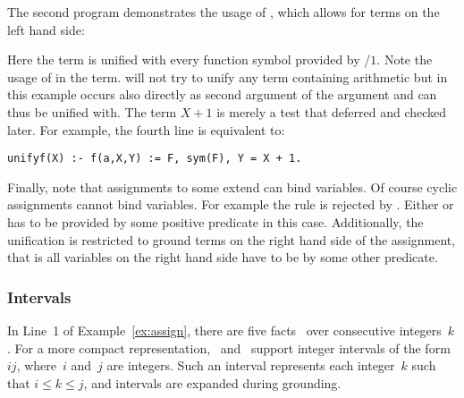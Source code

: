 \begin{example}\label{ex:unify}
The second program demonstrates the usage of \code{:=},
which allows for terms on the left hand side:
%
%

%
Here the term  is unified with every function symbol provided by /$1$.
Note the usage of  in the term.
\gringo{} will not try to unify any term containing arithmetic 
but in this example  occurs also directly as second argument of the argument
and can thus be unified with.
The term $X+1$ is merely a test that deferred and checked later.
For example, the fourth line is equivalent to:
\begin{lstlisting}[firstnumber=6]
unifyf(X) :- f(a,X,Y) := F, sym(F), Y = X + 1.
\end{lstlisting}%
\eexample
\end{example}

Finally, note that assignments to some extend can bind variables.
Of course cyclic assignments cannot bind variables.
For example the rule  is rejected by \gringo{}.
Either  or  has to be provided by some positive predicate in this case.
Additionally, the unification is restricted to ground terms on the right hand side of the assignment, 
that is all variables on the right hand side have to be by some other predicate.

\subsubsection{Intervals}\label{subsec:gringo:interval}

In Line~1 of Example~\ref{ex:assign},
there are five facts~
over consecutive integers~$k$.
For a more compact representation,
\gringo\ and \clingo\ support integer intervals of the form $i$$j$,
where~$i$ and~$j$ are integers.
Such an interval represents each integer~$k$ such that $i\leq k\leq j$,
and intervals are expanded during grounding.

